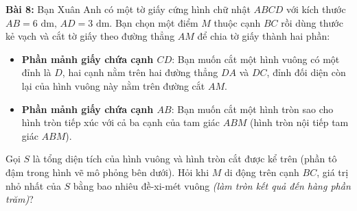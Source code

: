 \documentclass[12pt]{article}
\begin{document}
\begin{center}
	\end{center}
	
	
	\noindent \textbf{Bài 8:} Bạn Xuân Anh có một tờ giấy cứng hình chữ nhật $ABCD$ với kích thước $AB = 6\text{ dm}, \, AD = 3\text{ dm}$. Bạn chọn một điểm $M$ thuộc cạnh $BC$ rồi dùng thước kẻ vạch và cắt tờ giấy theo đường thẳng $AM$ để chia tờ giấy thành hai phần:
	\begin{itemize}
		\item \textbf{Phần mảnh giấy chứa cạnh $CD$}: Bạn muốn cắt một hình vuông có một đỉnh là $D$, hai cạnh nằm trên hai đường thẳng $DA$ và $DC$, đỉnh đối diện còn lại của hình vuông này nằm trên đường cắt $AM$.
		\item \textbf{Phần mảnh giấy chứa cạnh $AB$}: Bạn muốn cắt một hình tròn sao cho hình tròn tiếp xúc với cả ba cạnh của tam giác $ABM$ (hình tròn nội tiếp tam giác $ABM$).
	\end{itemize}
	Gọi $S$ là tổng diện tích của hình vuông và hình tròn cắt được kể trên (phần tô đậm trong hình vẽ mô phỏng bên dưới). Hỏi khi $M$ di động trên cạnh $BC$, giá trị nhỏ nhất của $S$ bằng bao nhiêu đề-xi-mét vuông \textit{(làm tròn kết quả đến hàng phần trăm)}?
	
\end{document}

